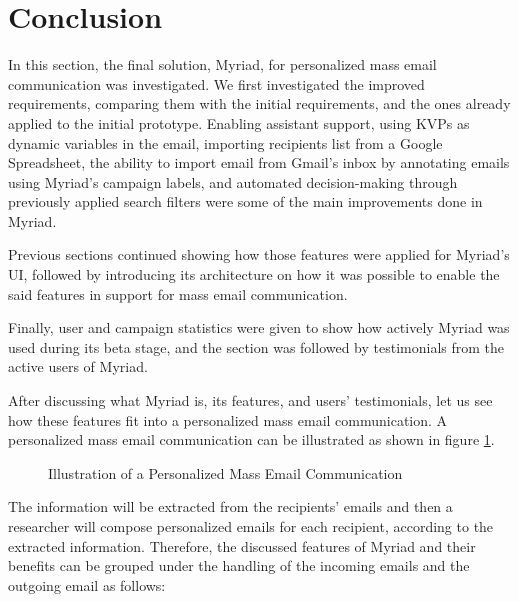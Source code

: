 \section{Conclusion}
\label{sec:5.5:Conc}

In this section, the final solution, Myriad, for personalized mass email communication was investigated. We first investigated the improved requirements, comparing them with the initial requirements, and the ones already applied to the initial prototype. Enabling assistant support, using \ac{KVP}s as dynamic variables in the email, importing recipients list from a Google Spreadsheet, the ability to import email from Gmail's inbox by annotating emails using Myriad's campaign labels, and automated decision-making through previously applied search filters were some of the main improvements done in Myriad.
\vspace{1cm}

Previous sections continued showing how those features were applied for Myriad's \ac{UI}, followed by introducing its architecture on how it was possible to enable the said features in support for mass email communication.
\vspace{1cm}

Finally, user and campaign statistics were given to show how actively Myriad was used during its beta stage, and the section was followed by testimonials from the active users of Myriad.
\vspace{1cm}

After discussing what Myriad is, its features, and users' testimonials, let us see how these features fit into a personalized mass email communication. A personalized mass email communication can be illustrated as shown in figure \ref{fig:drawingStatesOfEmailCommunication}.
\vspace{1cm}

\begin{figure}[htbp]
	\centering
	\begin{pdfpic}
	    
	\end{pdfpic}
	\caption[Illustration of a Personalized Mass Email Communication]{Illustration of a Personalized Mass Email Communication}
	\label{fig:drawingStatesOfEmailCommunication}
\end{figure}

The information will be extracted from the recipients' emails and then a researcher will compose personalized emails for each recipient, according to the extracted information. Therefore, the discussed features of Myriad and their benefits can be grouped under the handling of the incoming emails and the outgoing email as follows:
\vspace{1cm}

